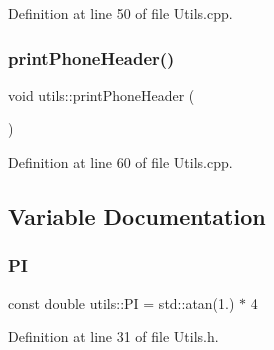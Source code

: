 Definition at line 50 of file Utils.\+cpp.

\mbox{\label{namespaceutils_a7633a4dfe509a009f4e02850b03ba1e4}} 
\subsubsection{print\+Phone\+Header()}
{\footnotesize\ttfamily void utils\+::print\+Phone\+Header (\begin{DoxyParamCaption}{ }\end{DoxyParamCaption})}



Definition at line 60 of file Utils.\+cpp.



\subsection{Variable Documentation}
\mbox{\label{namespaceutils_a92ce7d254229929886551de7417e1912}} 
\subsubsection{PI}
{\footnotesize\ttfamily const double utils\+::\+PI = std\+::atan(1.) $\ast$ 4}



Definition at line 31 of file Utils.\+h.

